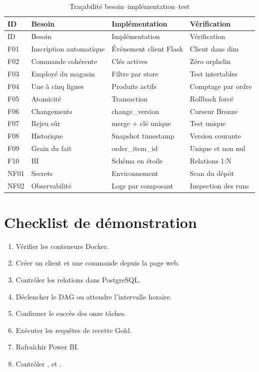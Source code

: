 \begin{longtable}{p{1.2cm}p{4.2cm}p{4.1cm}p{3.3cm}}
\caption{Traçabilité besoin--implémentation--test}\label{tab:traceability}\\
\toprule
ID & Besoin & Implémentation & Vérification \\
\midrule
\endfirsthead
\toprule ID & Besoin & Implémentation & Vérification \\
\midrule
\endhead
F01 & Inscription automatique & Événement client Flask & Client dans dim \\
F02 & Commande cohérente & Clés actives & Zéro orphelin \\
F03 & Employé du magasin & Filtre par store & Test intertables \\
F04 & Une à cinq lignes & Produits actifs & Comptage par ordre \\
F05 & Atomicité & Transaction & Rollback forcé \\
F06 & Changements & change\_version & Curseur Bronze \\
F07 & Rejeu sûr & merge + clé unique & Test unique \\
F08 & Historique & Snapshot timestamp & Version courante \\
F09 & Grain du fait & order\_item\_id & Unique et non nul \\
F10 & BI & Schéma en étoile & Relations 1:N \\
NF01 & Secrets & Environnement & Scan du dépôt \\
NF02 & Observabilité & Logs par composant & Inspection des runs \\
\bottomrule
\end{longtable}

\section{Checklist de démonstration}
\begin{enumerate}
  \item Vérifier les conteneurs Docker.
  \item Créer un client et une commande depuis la page web.
  \item Contrôler les relations dans PostgreSQL.
  \item Déclencher le DAG ou attendre l'intervalle horaire.
  \item Confirmer le succès des onze tâches.
  \item Exécuter les requêtes de recette Gold.
  \item Rafraîchir Power BI.
  \item Contrôler ,  et .
\end{enumerate}

